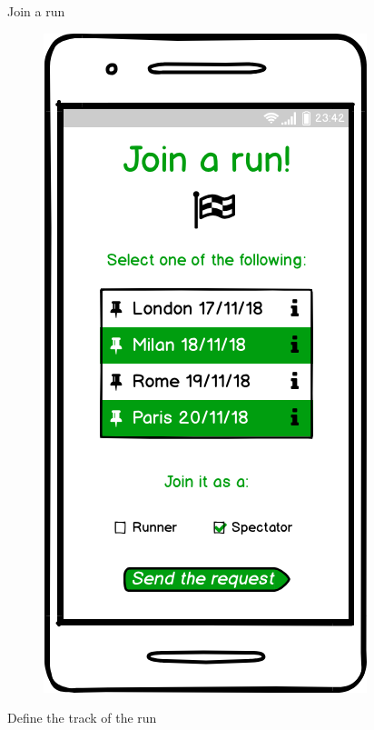 \documentclass{article}
\begin{document}
\begin{legal}
\begin{legal}
\begin{legal}
\begin{legal}
\begin{figure}[H]
				\end{figure}
				\item Join a run 
				\begin{figure}[H]
				\centering
  				\includegraphics[scale=0.3]{./images/mockups/Join-a-run.png}
				\end{figure}
				\item Define the track of the run 
				\begin{figure}[H]
				\centering

\end{figure}
\end{legal}
\end{legal}
\end{legal}
\end{legal}
\end{document}

